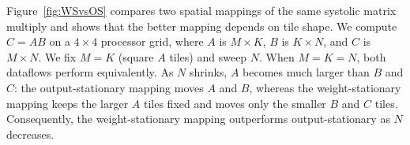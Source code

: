 \documentclass[sigplan, nonacm]{acmart}
\begin{document}



Figure~\ref{fig:WSvsOS} compares two spatial mappings of the same systolic matrix multiply and shows that the better mapping depends on tile shape. We compute $C=AB$ on a $4\times 4$ processor grid, where $A$ is $M\times K$, $B$ is $K\times N$, and $C$ is $M\times N$. We fix $M=K$ (square $A$ tiles) and sweep $N$. When $M=K=N$, both dataflows perform equivalently. As $N$ shrinks, $A$ becomes much larger than $B$ and $C$: the output-stationary mapping moves $A$ and $B$, whereas the weight-stationary mapping keeps the larger $A$ tiles fixed and moves only the smaller $B$ and $C$ tiles. Consequently, the weight-stationary mapping outperforms output-stationary as $N$ decreases.
\end{document}
